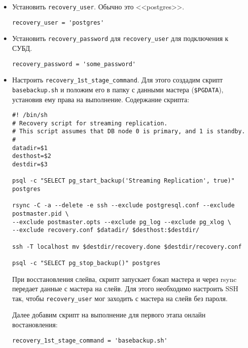 \begin{itemize}

  \item Установить \lstinline!recovery_user!. Обычно это <<postgres>>.

\begin{lstlisting}[label=lst:pgpool42,caption=recovery\_user]
recovery_user = 'postgres'
\end{lstlisting}

  \item Установить \lstinline!recovery_password! для \lstinline!recovery_user! для подключения к СУБД.

\begin{lstlisting}[label=lst:pgpool43,caption=recovery\_password]
recovery_password = 'some_password'
\end{lstlisting}

  \item Настроить \lstinline!recovery_1st_stage_command!. Для этого создадим скрипт \lstinline!basebackup.sh! и положим его в папку с данными мастера (\lstinline!$PGDATA!), установив ему права на выполнение. Содержание скрипта:

\begin{lstlisting}[label=lst:pgpool44,caption=basebackup.sh]
#! /bin/sh
# Recovery script for streaming replication.
# This script assumes that DB node 0 is primary, and 1 is standby.
#
datadir=$1
desthost=$2
destdir=$3

psql -c "SELECT pg_start_backup('Streaming Replication', true)" postgres

rsync -C -a --delete -e ssh --exclude postgresql.conf --exclude postmaster.pid \
--exclude postmaster.opts --exclude pg_log --exclude pg_xlog \
--exclude recovery.conf $datadir/ $desthost:$destdir/

ssh -T localhost mv $destdir/recovery.done $destdir/recovery.conf

psql -c "SELECT pg_stop_backup()" postgres
\end{lstlisting}

При восстановления слейва, скрипт запускает бэкап мастера и через rsync передает данные с мастера на слейв. Для этого необходимо настроить SSH так, чтобы \lstinline!recovery_user! мог заходить с мастера на слейв без пароля.

Далее добавим скрипт на выполнение для первого этапа онлайн востановления:

\begin{lstlisting}[label=lst:pgpool45,caption=recovery\_1st\_stage\_command]
recovery_1st_stage_command = 'basebackup.sh'
\end{lstlisting}


\end{itemize}
